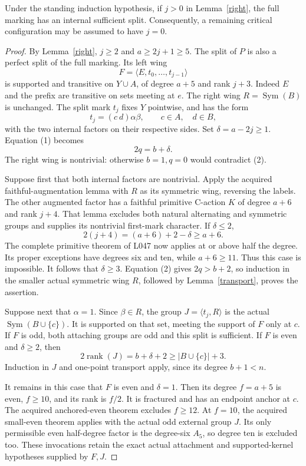 \documentclass[11pt,a4paper]{article}
\newcommand{\gen}[1]{\langle#1\rangle}
\newcommand{\Sym}{\operatorname{Sym}}
\begin{document}
\begin{theorem}\label{away}
Under the standing induction hypothesis, if $j>0$ in
Lemma~\ref{right}, the full marking has an internal
sufficient split. Consequently, a remaining critical
configuration may be assumed to have $j=0$.
\end{theorem}
\begin{proof}
By Lemma~\ref{right}, $j\ge2$ and $a\ge2j+1\ge5$.
The split of $P$ is also a perfect split of the full
marking. Its left wing
\[
 F=\gen{E,t_0,\ldots,t_{j-1}}
\]
is supported and transitive on $Y\cup A$, of degree
$a+5$ and rank $j+3$. Indeed $E$ and the prefix are
transitive on sets meeting at $e$. The right wing
$R=\Sym(B)$ is unchanged. The split mark $t_j$ fixes
$Y$ pointwise, and has the form
\[
                  t_j=(c\ d)\alpha\beta,
   \qquad c\in A,\quad d\in B,
\]
with the two internal factors on their respective sides.
Set $\delta=a-2j\ge1$. Equation (1) becomes
\[
                             2q=b+\delta.              \tag{2}
\]
The right wing is nontrivial: otherwise $b=1,q=0$
would contradict (2).

Suppose first that both internal factors are nontrivial.
Apply the acquired faithful-augmentation lemma with $R$
as its symmetric wing, reversing the labels. The other
augmented factor has a faithful primitive C-action $K$
of degree $a+6$ and rank $j+4$. That lemma excludes both
natural alternating and symmetric groups and supplies
its nontrivial first-mark character. If $\delta\le2$,
\[
                      2(j+4)=(a+6)+2-\delta\ge a+6.
\]
The complete primitive theorem of L047 now applies at
or above half the degree. Its proper exceptions have
degrees six and ten, while $a+6\ge11$. Thus this case
is impossible. It follows that $\delta\ge3$.
Equation (2) gives $2q>b+2$, so induction in the smaller
actual symmetric wing $R$, followed by
Lemma~\ref{transport}, proves the assertion.

Suppose next that $\alpha=1$. Since $\beta\in R$,
the group $J=\gen{t_j,R}$ is the actual
$\Sym(B\cup\{c\})$. It is supported on that set,
meeting the support of $F$ only at $c$. If $F$ is odd,
both attaching groups are odd and this split is sufficient.
If $F$ is even and $\delta\ge2$, then
\[
              2\operatorname{rank}(J)=b+\delta+2
                            \ge |B\cup\{c\}|+3.
\]
Induction in $J$ and one-point transport apply, since
its degree $b+1<n$.

It remains in this case that $F$ is even and $\delta=1$.
Then its degree $f=a+5$ is even, $f\ge10$, and its
rank is $f/2$. It is fractured and has an endpoint
anchor at $c$. The acquired anchored-even theorem
excludes $f\ge12$. At $f=10$, the acquired small-even
theorem applies with the actual odd external group $J$.
Its only permissible even half-degree factor is the
degree-six $A_5$, so degree ten is excluded too.
These invocations retain the exact actual attachment
and supported-kernel hypotheses supplied by $F,J$.


\end{proof}
\end{document}
